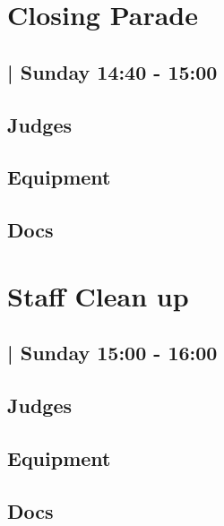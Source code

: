 \documentclass[10pt]{article}
\begin{document}
		\begin{minipage}{\linewidth}
		\setcounter{section}{50}
	\section{Closing Parade }
	\subsection*{ | Sunday 14:40 - 15:00}

	

	\begin{multicols}{2}
	\subsection*{\faUsers \: Judges}
	\begin{itemize}
		\end{itemize}
	\columnbreak
	\subsection*{\faWrench \: Equipment}
	        \vfill\null
        \subsection*{\faFile \: Docs}
     	\end{multicols}


	\vspace{1cm}
	\end{minipage}

		\begin{minipage}{\linewidth}
		\setcounter{section}{51}
	\section{Staff Clean up }
	\subsection*{ | Sunday 15:00 - 16:00}

	

	\begin{multicols}{2}
	\subsection*{\faUsers \: Judges}
	\begin{itemize}
		\end{itemize}
	\columnbreak
	\subsection*{\faWrench \: Equipment}
	        \vfill\null
        \subsection*{\faFile \: Docs}
     	\end{multicols}


	\vspace{1cm}
	\end{minipage}
\end{document}
